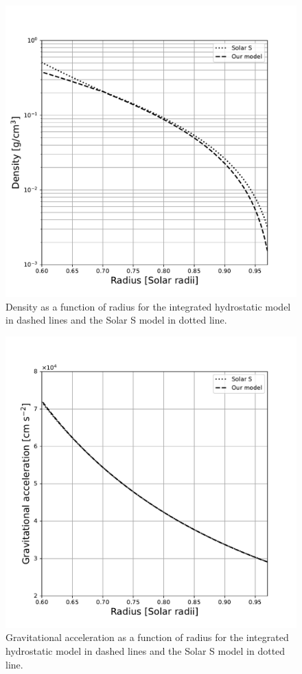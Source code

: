 \begin{figure}[htbp]
    \centering
    \includegraphics[width=0.8\linewidth]{./solar_vs_model_plots/Density.pdf} %
    \caption{Density as a function of radius for the integrated hydrostatic model in dashed lines and the Solar S model in dotted line.}
    \label{fig:density} %
\end{figure}

\begin{figure}[htbp]
    \centering
    \includegraphics[width=0.8\linewidth]{./solar_vs_model_plots/Gravitational_acceleration.pdf} %
    \caption{Gravitational acceleration as a function of radius for the integrated hydrostatic model in dashed lines and the Solar S model in dotted line.}
    \label{fig:gravitationa_acceleration} %
\end{figure}